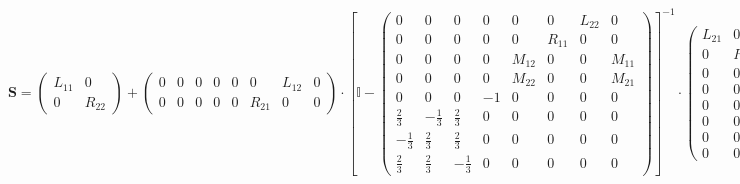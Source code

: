\[ \mathbf{S} = \left(\begin{smallmatrix} L_{11} & 0 \\ 0 & R_{22}
\end{smallmatrix}\right) + \left(\begin{smallmatrix} 0 & 0 & 0 & 0 & 0
& 0 & L_{12} & 0 \\ 0 & 0 & 0 & 0 & 0 & R_{21} & 0 & 0
\end{smallmatrix}\right) \cdot \left[ \mathbb{I}  -
\left(\begin{smallmatrix} 0 & 0 & 0 & 0 & 0 & 0 & L_{22} & 0 \\ 0 & 0
& 0 & 0 & 0 & R_{11} & 0 & 0 \\ 0 & 0 & 0 & 0 & M_{12} & 0 & 0 &
M_{11} \\ 0 & 0 & 0 & 0 & M_{22} & 0 & 0 & M_{21} \\ 0 & 0 & 0 & -1 &
0 & 0 & 0 & 0 \\ \frac{2}{3} & -\frac{1}{3} & \frac{2}{3} & 0 & 0 & 0
& 0 & 0 \\ -\frac{1}{3} & \frac{2}{3} & \frac{2}{3} & 0 & 0 & 0 & 0 &
0 \\ \frac{2}{3} & \frac{2}{3} & -\frac{1}{3} & 0 & 0 & 0 & 0 & 0
\end{smallmatrix}\right) \right]^{-1} \cdot\left(\begin{smallmatrix}
L_{21} & 0 \\ 0 & R_{12} \\ 0 & 0 \\ 0 & 0 \\ 0 & 0 \\ 0 & 0 \\ 0 & 0
\\ 0 & 0 \end{smallmatrix}\right) \]
